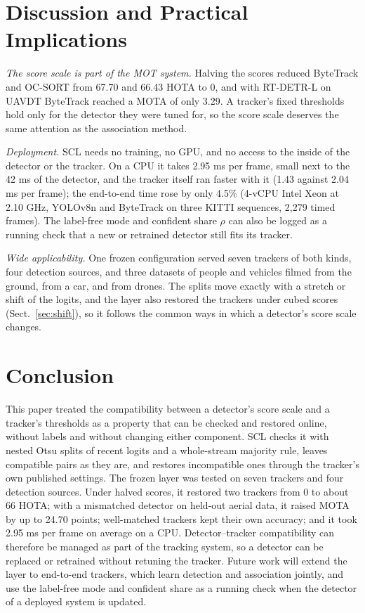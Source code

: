 \documentclass[pdflatex,sn-mathphys-num,iicol]{sn-jnl}
\newcommand{\scl}{SCL}
\begin{document}
\section{Discussion and Practical Implications}\label{sec:discussion}

\emph{The score scale is part of the MOT system.} Halving the scores reduced ByteTrack and OC-SORT
from 67.70 and 66.43 HOTA to 0, and with RT-DETR-L on UAVDT ByteTrack reached a MOTA of only 3.29.
A tracker's fixed thresholds hold only for the detector they were tuned for, so the score scale
deserves the same attention as the association method.

\emph{Deployment.} \scl{} needs no training, no GPU, and no access to the inside of the detector or
the tracker. On a CPU it takes 2.95 ms per frame, small next to the 42 ms of the detector, and the
tracker itself ran faster with it (1.43 against 2.04 ms per frame); the end-to-end time rose by
only 4.5\% (4-vCPU Intel Xeon at 2.10 GHz, YOLOv8n and ByteTrack on three KITTI sequences, 2,279
timed frames). The label-free mode and confident share $\rho$ can also be logged as a running check
that a new or retrained detector still fits its tracker.

\emph{Wide applicability.} One frozen configuration served seven trackers of both kinds, four
detection sources, and three datasets of people and vehicles filmed from the ground, from a car,
and from drones. The splits move exactly with a stretch or shift of the logits, and the layer also
restored the trackers under cubed scores (Sect.~\ref{sec:shift}), so it follows the common ways in
which a detector's score scale changes.
\FloatBarrier
\section{Conclusion}\label{sec:conclusion}

This paper treated the compatibility between a detector's score scale and a tracker's thresholds
as a property that can be checked and restored online, without labels and without changing either
component. \scl{} checks it with nested Otsu splits of recent logits and a whole-stream majority
rule, leaves compatible pairs as they are, and restores incompatible ones through the tracker's own
published settings. The frozen layer was tested on seven trackers and four
detection sources. Under halved scores, it restored two trackers from 0 to about 66 HOTA; with a
mismatched detector on held-out aerial data, it raised MOTA by up to 24.70 points; well-matched
trackers kept their own accuracy; and it took 2.95 ms per frame on average on a CPU.
Detector--tracker compatibility can therefore be managed as part of the tracking system, so a
detector can be replaced or retrained without retuning the tracker. Future work will extend the
layer to end-to-end trackers, which learn detection and association jointly, and use the label-free
mode and confident share as a running check when the detector of a deployed system is updated.
\end{document}
